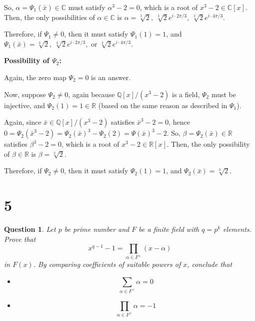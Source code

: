 \documentclass{article}
\newtheorem{question}{Question}
\begin{document}
\begin{itemize}
    So, $\alpha=\Psi_1(\bar{x})\in\mathbb{C}$ must satisfy $\alpha^3-2=0$, which is a root of $x^3-2\in\mathbb{C}[x]$. Then, the only possibilities of $\alpha\in \mathbb{C}$ is $\alpha=\sqrt[3]{2},\ \sqrt[3]{2}e^{i\cdot 2\pi/3},\ \sqrt[3]{2}e^{i\cdot 4\pi/3}$.

    Therefore, if $\Psi_1\neq 0$, then it must satisfy $\Psi_1(1)=1$, and $\Psi_1(\bar{x})=\sqrt[3]{2},\ \sqrt[3]{2}e^{i\cdot 2\pi/3},$ or $\sqrt[3]{2}e^{i\cdot 4\pi/3}$.

    \hfil

    \textbf{Possibility of $\Psi_2$:}

    Again, the zero map $\Psi_2=0$ is an answer.

    Now, suppose $\Psi_2\neq 0$, again because $\mathbb{Q}[x]/(x^3-2)$ is a field, $\Psi_2$ must be injective, and $\Psi_2(1)=1\in\mathbb{R}$ (based on the same reason as described in $\Psi_1$).

    Again, since $\bar{x}\in\mathbb{Q}[x]/(x^3-2)$ satisfies $\bar{x}^3-2=0$, hence $0=\Psi_2(\bar{x}^3-2)=\Psi_2(\bar{x})^3-\Psi_2(2)=\Psi(\bar{x})^3-2$.
    So, $\beta=\Psi_2(\bar{x})\in\mathbb{R}$ satisfies $\beta^3-2=0$, which is a root of $x^3-2\in\mathbb{R}[x]$. Then, the only possibility of $\beta\in\mathbb{R}$ is $\beta=\sqrt[3]{2}$.

    Therefore, if $\Psi_2\neq 0$, then it must satisfy $\Psi_2(1)=1$, and $\Psi_2(\bar{x})=\sqrt[3]{2}$.

\end{itemize}

\break

\section*{5}
\begin{myBox}[]{}
    \begin{question}
        Let $p$ be  prime number and $F$ be a finite field with $q=p^k$ elements. Prove that
        $$x^{q-1}-1=\prod_{\alpha\in F^\times}(x-\alpha)$$
        in $F(x)$. By comparing coefficients of suitable powers of $x$, conclude that
        \begin{itemize}
            \item[(a)]$$\sum_{\alpha\in F^\times}\alpha =0$$
            \item[(b)] $$\prod_{\alpha\in F^{\times}}\alpha=-1$$
        \end{itemize}
    \end{question}
\end{myBox}
\end{document}

